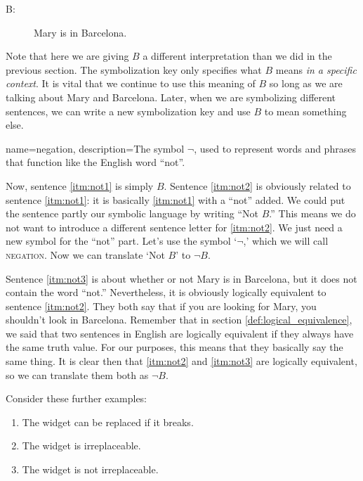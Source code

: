 \begin{description}
\item[B:]Mary is in Barcelona.
\end{description}

Note that here we are giving $B$ a different interpretation than we did in the previous section. The symbolization key only specifies what $B$ means \emph{in a specific context}. It is vital that we continue to use this meaning of $B$ so long as we are talking about Mary and Barcelona. Later, when we are symbolizing different sentences, we can write a new symbolization key and use $B$ to mean something else.

{
name=negation,
description={The symbol \(\lnot\), used to represent words and phrases that function like the English word ``not''.}
}

Now, sentence \ref{itm:not1} is simply $B$. Sentence \ref{itm:not2} is obviously related to sentence \ref{itm:not1}: it is basically \ref{itm:not1} with a ``not'' added. We could put the sentence partly our symbolic language by writing ``Not $B$.'' This means we do not want to introduce a different sentence letter for \ref{itm:not2}. We just need a new symbol for the ``not'' part. Let's use the symbol `$\lnot$,' which we will call \textsc{\gls{negation}}. \label{def:negation} Now we can translate `Not $B$' to $\lnot B$.

Sentence \ref{itm:not3} is about whether or not Mary is in Barcelona, but it does not contain the word ``not.'' Nevertheless, it is obviously logically equivalent to sentence \ref{itm:not2}. They both say that if you are looking for Mary, you shouldn't look in Barcelona. Remember that in section \ref{def:logical_equivalence}, we said that two sentences in English are logically equivalent if they always have the same truth value. For our purposes, this means that they basically say the same thing. It is clear then that \ref{itm:not2} and \ref{itm:not3} are logically equivalent, so we can translate them both as $\lnot B$.

Consider these further examples:
\begin{enumerate}
\item The widget can be replaced if it breaks. \label{itm:not4}
\item The widget is irreplaceable. \label{itm:not5}
\item The widget is not irreplaceable. \label{itm:not5b}
\end{enumerate}

